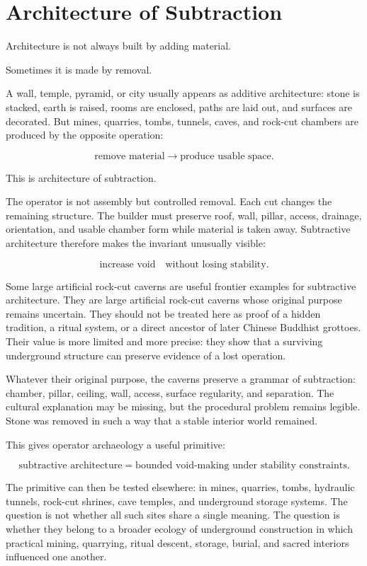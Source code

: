 \documentclass[11pt]{book}
\begin{document}
\section{Architecture of Subtraction}

Architecture is not always built by adding material.

Sometimes it is made by removal.

A wall, temple, pyramid, or city usually appears as additive architecture: stone is stacked, earth is raised, rooms are enclosed, paths are laid out, and surfaces are decorated. But mines, quarries, tombs, tunnels, caves, and rock-cut chambers are produced by the opposite operation:

\[
\text{remove material} \rightarrow \text{produce usable space}.
\]

This is architecture of subtraction.

The operator is not assembly but controlled removal. Each cut changes the remaining structure. The builder must preserve roof, wall, pillar, access, drainage, orientation, and usable chamber form while material is taken away. Subtractive architecture therefore makes the invariant unusually visible:

\[
\text{increase void} \quad \text{without losing stability}.
\]

Some large artificial rock-cut caverns are useful frontier examples for subtractive architecture. They are large artificial rock-cut caverns whose original purpose remains uncertain. They should not be treated here as proof of a hidden tradition, a ritual system, or a direct ancestor of later Chinese Buddhist grottoes. Their value is more limited and more precise: they show that a surviving underground structure can preserve evidence of a lost operation.

Whatever their original purpose, the caverns preserve a grammar of subtraction: chamber, pillar, ceiling, wall, access, surface regularity, and separation. The cultural explanation may be missing, but the procedural problem remains legible. Stone was removed in such a way that a stable interior world remained.

This gives operator archaeology a useful primitive:

\[
\text{subtractive architecture} =
\text{bounded void-making under stability constraints}.
\]

The primitive can then be tested elsewhere: in mines, quarries, tombs, hydraulic tunnels, rock-cut shrines, cave temples, and underground storage systems. The question is not whether all such sites share a single meaning. The question is whether they belong to a broader ecology of underground construction in which practical mining, quarrying, ritual descent, storage, burial, and sacred interiors influenced one another.
\end{document}
